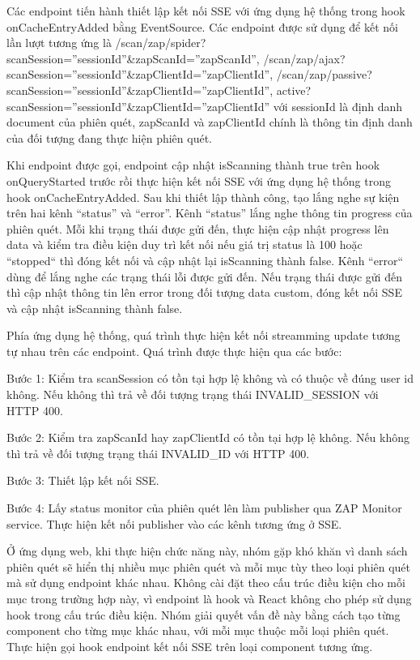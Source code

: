 Các endpoint tiến hành thiết lập kết nối SSE với ứng dụng hệ thống trong hook onCacheEntryAdded bằng EventSource. Các endpoint được sử dụng để kết nối lần lượt tương ứng là /scan/zap/spider?scanSession=”sessionId”\&zapScanId=”zapScanId”, /scan/zap/ajax?scanSession=”sessionId”\&zapClientId=”zapClientId”, /scan/zap/passive?scanSession=”sessionId”\&zapClientId=”zapClientId”, active?scanSession=”sessionId”\&zapClientId=”zapClientId” với sessionId là định danh document của phiên quét, zapScanId và zapClientId chính là thông tin định danh của đối tượng đang thực hiện phiên quét. 

Khi endpoint được gọi, endpoint cập nhật isScanning thành true trên hook onQueryStarted trước rồi thực hiện kết nối SSE với ứng dụng hệ thống trong hook onCacheEntryAdded. Sau khi thiết lập thành công, tạo lắng nghe sự kiện trên hai kênh “status” và “error”. Kênh “status” lắng nghe thông tin progress của phiên quét. Mỗi khi trạng thái được gửi đến, thực hiện cập nhật progress lên data và kiểm tra điều kiện duy trì kết nối nếu giá trị status là 100 hoặc “stopped“ thì đóng kết nối và cập nhật lại isScanning thành false. Kênh “error“ dùng để lắng nghe các trạng thái lỗi được gửi đến. Nếu trạng thái được gửi đến thì cập nhật thông tin lên error trong đối tượng data custom, đóng kết nối SSE và cập nhật isScanning thành false.

Phía ứng dụng hệ thống, quá trình thực hiện kết nối streamming update tương tự nhau trên các endpoint. Quá trình được thực hiện qua các bước:

Bước 1: Kiểm tra scanSession có tồn tại hợp lệ không và có thuộc về đúng user id không. Nếu không thì trả về đối tượng trạng thái INVALID\_SESSION với HTTP 400.

Bước 2: Kiểm tra zapScanId hay zapClientId có tồn tại hợp lệ không. Nếu không thì trả về đối tượng trạng thái INVALID\_ID với HTTP 400.

Bước 3: Thiết lập kết nối SSE.

Bước 4: Lấy status monitor của phiên quét lên làm publisher qua ZAP Monitor service. Thực hiện kết nối publisher vào các kênh tương ứng ở SSE.

Ở ứng dụng web, khi thực hiện chức năng này, nhóm gặp khó khăn vì danh sách phiên quét sẽ hiển thị nhiều mục phiên quét và mỗi mục tùy theo loại phiên quét mà sử dụng endpoint khác nhau. Không cài đặt theo cấu trúc điều kiện cho mỗi mục trong trường hợp này, vì endpoint là hook và React không cho phép sử dụng hook trong cấu trúc điều kiện. Nhóm giải quyết vấn đề này bằng cách tạo từng component cho từng mục khác nhau, với mỗi mục thuộc mỗi loại phiên quét. Thực hiện gọi hook endpoint kết nối SSE trên loại component tương ứng. 